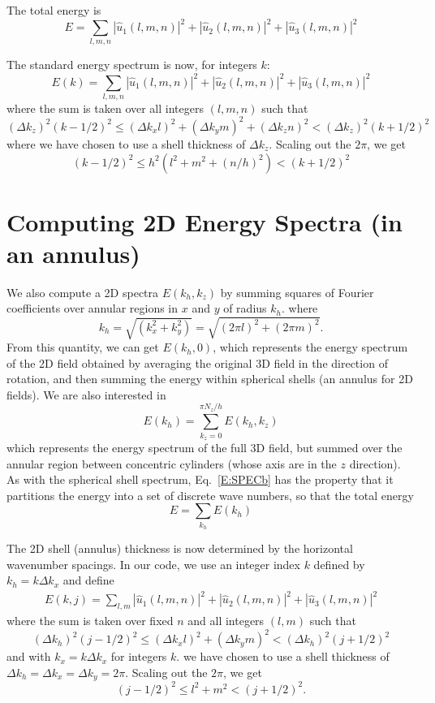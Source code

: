 \documentclass[12pt]{article}
\begin{document}
The total energy is
\[
E  = \sum_{l,m,n}  |  {\hat u_1}(l,m,n) |^2 +
 |  {\hat u_2}(l,m,n) |^2 + 
 |  {\hat u_3}(l,m,n) |^2
\]

The standard energy spectrum is now, for integers $k$:
\[
E(k)  = \sum_{l,m,n}  |  {\hat u_1}(l,m,n) |^2 +
 |  {\hat u_2}(l,m,n) |^2 + 
 |  {\hat u_3}(l,m,n) |^2
\]
where the sum is taken over all integers $(l,m,n)$ such that
\[
(\Delta k_z)^2 (k-1/2)^2 \le (\Delta k_x l)^2 + (\Delta k_y m)^2 + (\Delta k_z n)^2 <  (\Delta k_z)^2 (k+1/2)^2 
\]
where we have chosen to use a shell thickness of $\Delta k_z$.
Scaling out the $2\pi$, we get
\[
(k-1/2)^2 \le  h^2 \left( l^2 + m^2 + (n/h)^2 \right) < (k+1/2)^2
\]  





\section{Computing 2D Energy Spectra (in an annulus)}
We also compute a 2D spectra $E(k_h,k_z)$ by summing squares of Fourier
coefficients over annular regions in 
$x$ and $y$ of radius $k_h$.  
where 
\[
k_h = \sqrt{(k_x^2 + k_y^2)} = \sqrt{(2\pi l)^2 + (2\pi m)^2}. 
\]
From this quantity, we can get $E(k_h,0)$, which 
represents the energy spectrum of the 2D field
obtained by averaging the original 3D field  in the direction of rotation,
and then summing the energy within spherical shells (an annulus for 2D fields).
We are also interested in 
\begin{equation}
E(k_h) = \sum_{k_z=0}^{\pi N_z/h} E(k_h,k_z) 
\label{E:SPECb}
\end{equation}
which represents 
the energy spectrum of the full 3D field, but summed over
the annular region between concentric cylinders
(whose axis are in the $z$ direction).  As with the spherical
shell spectrum, Eq.~\ref{E:SPECb} has the property that
it partitions the energy into a set of discrete wave numbers, so
that the total energy 
\[
E = \sum_{k_h} E(k_h)
\]


The 2D shell (annulus) thickness is now
determined by the horizontal wavenumber spacings. In our code,
we use an integer index $k$ defined by $k_h = k \Delta k_x$ and
define
\begin{eqnarray*}
E(k,j) = \sum_{l,m}  |  {\hat u_1}(l,m,n) |^2 +
 |  {\hat u_2}(l,m,n) |^2 + 
 |  {\hat u_3}(l,m,n) |^2
\end{eqnarray*}
where the sum is taken over fixed $n$ and all integers $(l,m)$ such that 
\[
(\Delta k_h)^2 (j-1/2)^2 \le (\Delta k_x l)^2 + (\Delta k_y m)^2  <  (\Delta k_h)^2 (j+1/2)^2 
\]
and with $k_x=k \Delta k_x$ for integers $k$.  
we have chosen to use a shell thickness of $\Delta k_h =\Delta k_x = \Delta
k_y = 2\pi$. Scaling out the $2\pi$, we get
\[
(j-1/2)^2 \le  l^2 +  m^2 < (j+1/2)^2.
\]  
\end{document}
